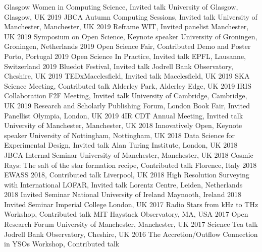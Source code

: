 \begin{cvpress} 
   \cvpres
    {Glasgow Women in Computing Science, Invited talk}
    {University of Glasgow, Glasgow, UK}
    {2019}
   \cvpres
    {JBCA Autumn Computing Sessions, Invited talk}
    {University of Manchester, Manchester, UK}
    {2019}
   \cvpres
    {Reframe WIT, Invited panelist}
    {Manchester, UK}
    {2019}
   \cvpres
    {Symposium on Open Science, Keynote speaker}
    {University of Groningen, Groningen, Netherlands}
    {2019}
   \cvpres
    {Open Science Fair, Contributed Demo and Poster}
    {Porto, Portugal}
    {2019} 
   \cvpres
    {Open Science In Practice, Invited talk}
    {EPFL, Lausanne, Switzerland}
    {2019} 
   \cvpres
    {Bluedot Festival, Invited talk}
    {Jodrell Bank Observatory, Cheshire, UK}
    {2019} 
   \cvpres
    {TEDxMacclesfield, Invited talk}
    {Macclesfield, UK}
    {2019} 
   \cvpres
    {SKA Science Meeting, Contributed talk}
    {Alderley Park, Alderley Edge, UK}
    {2019}  
   \cvpres
    {IRIS Collaboration F2F Meeting, Invited talk}
    {University of Cambridge, Cambridge, UK}
    {2019}  
   \cvpres
    {Research and Scholarly Publishing Forum, London Book Fair, Invited Panellist}
    {Olympia, London, UK}
    {2019} 
   \cvpres
    {4IR CDT Annual Meeting, Invited talk}
    {University of Manchester, Manchester, UK}
    {2018}  
   \cvpres
    {Innovatively Open, Keynote speaker}
    {University of Nottingham, Nottingham, UK}
    {2018}  
   \cvpres
    {Data Science for Experimental Design, Invited talk}
    {Alan Turing Institute, London, UK}
    {2018}  
   \cvpres
    {JBCA Internal Seminar}
    {University of Manchester, Manchester, UK}
    {2018}   
   \cvpres
    {Cosmic Rays: The salt of the star formation recipe, Contributed talk}
    {Florence, Italy}
    {2018}
   \cvpres
    {EWASS 2018, Contributed talk}
    {Liverpool, UK}
    {2018}
\cvpres
    {High Resolution Surveying with International LOFAR, Invited talk}
    {Lorentz Centre, Leiden, Netherlands}
    {2018}
   \cvpres
    {Invited Seminar}
    {National University of Ireland Maynooth, Ireland}
    {2018}
   \cvpres
    {Invited Seminar}
    {Imperial College London, UK}
    {2017}
   \cvpres
    {Radio Stars from kHz to THz Workshop, Contributed talk}
    {MIT Haystack Observatory, MA, USA}
    {2017}
   \cvpres
    {Open Research Forum}
    {University of Manchester, Manchester, UK}
    {2017}
  \cvpres
  {Science Tea talk}
  {Jodrell Bank Observatory, Cheshire, UK}
  {2016}
  \cvpres
    {The Accretion/Outflow Connection in YSOs Workshop, Contributed talk}

\end{cvpress}
